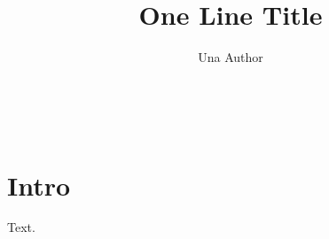 \documentclass{article}
\title{One Line Title}
\author{Una Author}
\begin{document}
\begin{center}\@title\ \@author\end{center}
\section{Intro}
Text.
\end{document}
